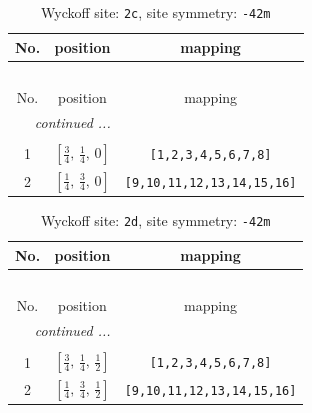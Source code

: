 \documentclass[fleqn,8pt]{jsarticle}
\begin{document}
\renewcommand{\arraystretch}{1.2}
\begin{longtable}{ccc}
\caption{Wyckoff site: {\tt 2c}, site symmetry: {\tt -42m}}
 \\
 \hline \hline
No. & position & mapping \\ \hline \endfirsthead

\multicolumn{2}{l}{\tablename\ \thetable{}} \\
 \hline \hline
No. & position & mapping \\ \hline \endhead

 \hline \hline
\multicolumn{2}{r}{\footnotesize\it continued ...} \\ \endfoot

 \hline \hline
\multicolumn{2}{r}{} \\ \endlastfoot

1 & $\left[ \frac{3}{4},\, \frac{1}{4},\, 0 \right]$ & {\tt [1,2,3,4,5,6,7,8]} \\ \hline
2 & $\left[ \frac{1}{4},\, \frac{3}{4},\, 0 \right]$ & {\tt [9,10,11,12,13,14,15,16]} \\
\end{longtable}
\renewcommand{\arraystretch}{1.2}
\begin{longtable}{ccc}
\caption{Wyckoff site: {\tt 2d}, site symmetry: {\tt -42m}}
 \\
 \hline \hline
No. & position & mapping \\ \hline \endfirsthead

\multicolumn{2}{l}{\tablename\ \thetable{}} \\
 \hline \hline
No. & position & mapping \\ \hline \endhead

 \hline \hline
\multicolumn{2}{r}{\footnotesize\it continued ...} \\ \endfoot

 \hline \hline
\multicolumn{2}{r}{} \\ \endlastfoot

1 & $\left[ \frac{3}{4},\, \frac{1}{4},\, \frac{1}{2} \right]$ & {\tt [1,2,3,4,5,6,7,8]} \\ \hline
2 & $\left[ \frac{1}{4},\, \frac{3}{4},\, \frac{1}{2} \right]$ & {\tt [9,10,11,12,13,14,15,16]} \\
\end{longtable}
\renewcommand{\arraystretch}{1.2}
\end{document}
